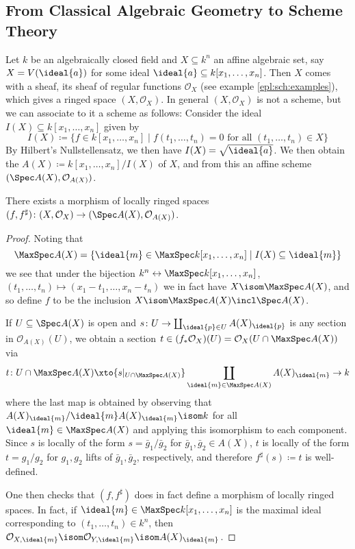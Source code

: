 \documentclass[wip, algebra]{bsteffan-lecturenotes}
\newcommand{\cO}{\mathcal{O}}
\begin{document}
\subsection{From Classical Algebraic Geometry to Scheme Theory}
Let $k$ be an algebraically closed field and $X \subseteq k^n$ an affine algebraic set, say $X = V(\ideal{a})$ for some ideal $\ideal{a} \subseteq k[x_1, \ldots, x_n]$.
Then $X$ comes with a sheaf, its sheaf of regular functions $\cO_X$ (see example \ref{epl:sch:examples}), which gives a ringed space $(X, \cO_X)$.
In general $(X, \cO_X)$ is not a scheme, but we can associate to it a scheme as follows:
Consider the ideal $I(X) \subseteq k[x_1, \ldots, x_n]$ given by 
\begin{equation*}
	I(X) \coloneq \{f \in k[x_1, \ldots, x_n] \mid f(t_1, \ldots, t_n) = 0 \text{ for all } (t_1, \ldots, t_n) \in X\}
\end{equation*}
By Hilbert's Nullstellensatz, we then have $I(X) = \sqrt{\ideal{a}}$.
We then obtain the  $A(X) \coloneq k[x_1, \ldots, x_n] / I(X)$ of $X$, and from this an affine scheme $(\Spec A(X), \cO_{A(X)})$.
\begin{proposition}
	There exists a morphism of locally ringed spaces $(f, f^\sharp)\colon (X, \cO_X) \to (\Spec A(X), \cO_{A(X)})$.
\end{proposition}
\begin{proof}
	Noting that 
	\begin{equation*}
		\MaxSpec A(X) = \{\ideal{m} \in \MaxSpec k[x_1, \ldots, x_n] \mid I(X) \subseteq \ideal{m}\}
	\end{equation*}
	we see that under the bijection $k^n \leftrightarrow \MaxSpec k[x_1, \ldots, x_n]$, $(t_1, \ldots, t_n) \mapsto (x_1 - t_1, \ldots, x_n - t_n)$ we in fact have $X \isom \MaxSpec A(X)$, and so define $f$ to be the inclusion $X \isom \MaxSpec A(X) \incl \Spec A(X)$.

	If $U \subseteq \Spec A(X)$ is open and $s\colon U \to \coprod_{\ideal{p} \in U} A(X)_{\ideal{p}}$ is any section in $\cO_{A(X)}(U)$, we obtain a section $t \in (f_* \cO_X)(U) = \cO_X(U \cap \MaxSpec A(X))$ via
	\begin{equation*}
		t\colon U \cap \MaxSpec A(X) \xto{s|_{U \cap \MaxSpec A(X)}} \coprod_{\ideal{m} \in \MaxSpec A(X)} A(X)_{\ideal{m}} \to k
	\end{equation*}
	where the last map is obtained by observing that $A(X)_{\ideal{m}} / \ideal{m} A(X)_{\ideal{m}} \isom k$ for all $\ideal{m} \in \MaxSpec A(X)$ and applying this isomorphism to each component.
	Since $s$ is locally of the form $s = \bar{g}_1 / \bar{g}_2$ for $\bar{g}_1, \bar{g}_2 \in A(X)$, $t$ is locally of the form $t = g_1 / g_2$ for $g_1, g_2$ lifts of $\bar{g}_1, \bar{g}_2$, respectively, and therefore $f^\sharp(s) \coloneq t$ is well-defined.

	One then checks that $(f, f^\sharp)$ does in fact define a morphism of locally ringed spaces.
	In fact, if $\ideal{m} \in \MaxSpec k[x_1, \ldots, x_n]$ is the maximal ideal corresponding to $(t_1, \ldots, t_n) \in k^n$, then $\cO_{X, \ideal{m}} \isom \cO_{Y, \ideal{m}} \isom A(X)_{\ideal{m}}$.
\end{proof}
\end{document}
